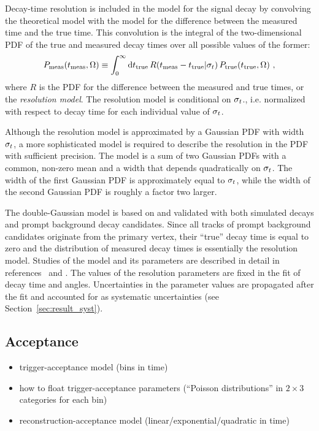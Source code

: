 Decay-time resolution is included in the model for the signal decay by convolving the theoretical model with the model for the difference
between the measured time and the true time. This convolution is the integral of the two-dimensional PDF of the true and measured decay
times over all possible values of the former:
\begin{equation}
  P_\text{meas}(t_\text{meas}, \Omega)
    \equiv \int_0^\infty \ud t_\text{true}\, R(t_\text{meas} - t_\text{true}|\sigmat)\, P_\text{true}(t_\text{true}, \Omega)\ ,
\end{equation}
where $R$ is the PDF for the difference between the measured and true times, or the \emph{resolution model}. The resolution model is
conditional on $\sigma_t$., i.e. normalized with respect to decay time for each individual value of $\sigma_t$.

Although the resolution model is approximated by a Gaussian PDF with width $\sigma_t$, a more sophisticated model is required to describe
the resolution in the PDF with sufficient precision. The model is a sum of two Gaussian PDFs with a common, non-zero mean and a width that
depends quadratically on $\sigma_t$. The width of the first Gaussian PDF is approximately equal to $\sigma_t$, while the width of the second
Gaussian PDF is roughly a factor two larger.

The double-Gaussian model is based on and validated with both simulated \BstoJpsiKK{} decays and prompt background decay candidates. Since
all tracks of prompt background candidates originate from the primary vertex, their ``true'' decay time is equal to zero and the
distribution of measured decay times is essentially the resolution model. Studies of the model and its parameters are described in detail
in references~\cite{Aaij:2015} and \cite{LHCb-ANA-2014-039}. The values of the resolution parameters are fixed in the fit of decay time and
angles. Uncertainties in the parameter values are propagated after the fit and accounted for as systematic uncertainties (see
Section~\ref{sec:result_syst}).


\subsection{Acceptance}
\label{subsec:ana_time_acc}

\begin{itemize}
  \item trigger-acceptance model (bins in time)
  \item how to float trigger-acceptance parameters (``Poisson distributions'' in $2\times3$ categories for each bin)
  \item reconstruction-acceptance model (linear/exponential/quadratic in time)
\end{itemize}


